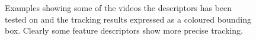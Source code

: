 \documentclass[letterpaper, 10pt, conference]{ieeeconf}
\begin{document}
\begin{figure}[t]
	\vspace{2mm}
\centerline{%
	}
	\vspace{-2mm}
\centerline{%
	}
\caption{Examples showing some of the videos the descriptors has been tested on and the tracking results expressed as a coloured bounding box. Clearly some feature descriptors show more precise tracking.}
\vspace{-3mm}
\label{fig:intro}
\end{figure}
\end{document}
